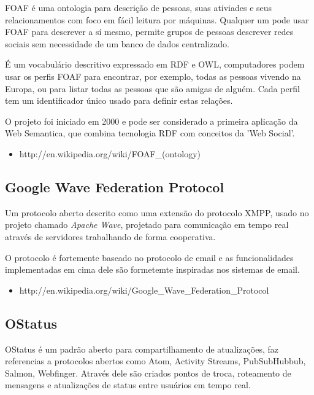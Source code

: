\documentclass[12pt]{article}
\begin{document}
FOAF é uma ontologia para descrição de pessoas, suas ativiades e seus
relacionamentos com foco em fácil leitura por máquinas. Qualquer um pode usar
FOAF para descrever a sí mesmo, permite grupos de pessoas descrever redes
sociais sem necessidade de um banco de dados centralizado.

É um vocabulário descritivo expressado em RDF e OWL, computadores podem
usar os perfis FOAF para encontrar, por exemplo, todas as pessoas vivendo na
Europa, ou para listar todas as pessoas que são amigas de alguém. Cada perfil
tem um identificador único usado para definir estas relações.

O projeto foi iniciado em 2000 e pode ser considerado a primeira aplicação da
Web Semantica, que combina tecnologia RDF com conceitos da 'Web Social'.

\begin{itemize}
  \item http://en.wikipedia.org/wiki/FOAF\_(ontology)
\end{itemize}

\subsection{Google Wave Federation Protocol}

Um protocolo aberto descrito como uma extensão do protocolo XMPP\cite{xmpp},
usado no projeto chamado {\it Apache Wave}\cite{wave}, projetado para
comunicação em tempo real através de servidores trabalhando de forma
cooperativa.

O protocolo é fortemente baseado no protocolo de email e as funcionalidades
implementadas em cima dele são formetemte inspiradas nos sistemas de email.

\begin{itemize}
  \item http://en.wikipedia.org/wiki/Google\_Wave\_Federation\_Protocol
\end{itemize}

\subsection{OStatus}

OStatus é um padrão aberto para compartilhamento de atualizações, faz
referencias a protocolos abertos como Atom, Activity Streams, PubSubHubbub,
Salmon, Webfinger. Através dele são criados pontos de troca, roteamento de
mensagens e atualizações de status entre usuários em tempo real.
\end{document}
